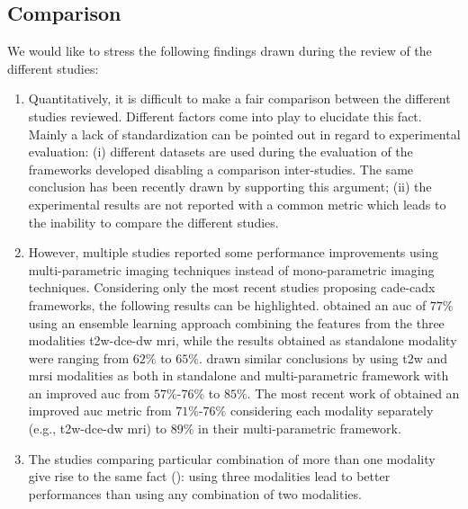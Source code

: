 \subsection{Comparison}

{\color{red} We would like to stress the following findings drawn during the review of the different studies:

\begin{enumerate}
	\item Quantitatively, it is difficult to make a fair comparison between the different studies reviewed. Different factors come into play to elucidate this fact. Mainly a lack of standardization can be pointed out in regard to experimental evaluation: (i) different datasets are used during the evaluation of the frameworks developed disabling a comparison inter-studies. The same conclusion has been recently drawn by \cite{Litjens2014} supporting this argument; (ii) the experimental results are not reported with a common metric which leads to the inability to compare the different studies.
	
	\item \label{here} However, multiple studies reported some performance improvements using multi-parametric imaging techniques instead of mono-parametric imaging techniques. Considering only the most recent studies proposing \ac{cade}-\ac{cadx} frameworks, the following results can be highlighted. 	
	\cite{Viswanath2011} obtained an \ac{auc} of $77\%$ using an ensemble learning approach combining the features from the three modalities \ac{t2w}-\ac{dce}-\ac{dw} \ac{mri}, while the results obtained as standalone modality were ranging from $62\%$ to $65\%$. 	
	\cite{Tiwari2013} drawn similar conclusions by using \ac{t2w} and \ac{mrsi} modalities as both in standalone and multi-parametric framework with an improved \ac{auc} from $57\%$-$76\%$ to $85\%$. 	
	The most recent work of \cite{Litjens2014} obtained an improved \ac{auc} metric from $71\%$-$76\%$ considering each modality separately (e.g., \ac{t2w}-\ac{dce}-\ac{dw} \ac{mri}) to $89\%$ in their multi-parametric framework.
	
		\item The studies comparing particular combination of more than one modality give rise to the same fact (\cite{Ozer2010,Litjens2011,Liu2013,Litjens2014}): using three modalities lead to better performances than using any combination of two modalities. 
	

\end{enumerate}}

